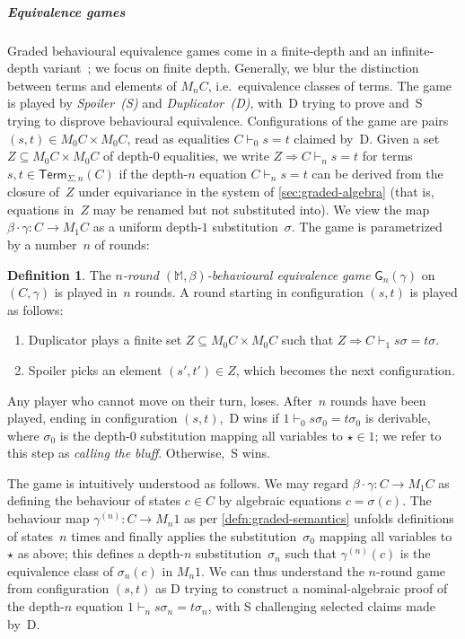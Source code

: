 \documentclass[11pt,a4paper]{amsart}
\newcommand{\Term}{\mathsf{Term}}
\newcommand{\centails}{\Rightarrow}
\newcommand{\game}{\mathsf{G}}
\newcommand{\pow}{\mathcal{P}}
\newcommand{\powf}{\pow_{\omega}}
\theoremstyle{plain}
\numberwithin{equation}{section}
\newcommand{\monad}{{\mathbb{M}}}
\newcommand{\+}[1]{\mathcal{#1}\xspace}
\theoremstyle{definition}
\newtheorem{defn}[defn]{Definition}
\begin{document}
\subparagraph*{Equivalence games} Graded behavioural equivalence games
come in a finite-depth and an infinite-depth
variant~\cite{FordEA22}; %
we focus on finite depth. Generally, we blur the distinction between
terms and elements of $M_nC$, i.e.~equivalence classes of terms.  The
game is played by \emph{Spoiler~(S)} and \emph{Duplicator~(D)}, with~D
trying to prove and~S trying to disprove behavioural
equivalence. Configurations of the game are pairs
$(s,t)\in M_0C\times M_0C$, read as equalities $C\vdash_0 s=t$ claimed
by~D. Given a set $Z\subseteq M_0C\times M_0C$ of depth-$0$
equalities, we write $Z\centails C\vdash_n s=t$ for terms
$s,t\in\Term_{\Sigma, n}(C)$ if the depth-$n$ equation $C\vdash_n s=t$
can be derived from the closure of~$Z$ under equivariance in the
system of \cref{sec:graded-algebra} (that is, equations in~$Z$ may be
renamed but not substituted into). We view the map
$\beta\cdot\gamma\colon C\to M_1C$ as a uniform depth-$1$
substitution~$\sigma$. The game is parametrized by a number~$n$ of
rounds: %

\begin{defn}
  The \emph{$n$-round $(\monad,\beta)$-behavioural equivalence game}
  $\game_n(\gamma)$ on~$(C,\gamma)$ is played in~$n$ rounds. A round
  starting in configuration $(s,t)$ is played as follows:
  \begin{enumerate}
  \item Duplicator plays a finite set $Z\subseteq M_0C\times M_0C$ such
    that $Z\centails C\vdash_1 s\sigma=t\sigma$.
  \item Spoiler picks an element $(s',t')\in Z$, which becomes the next
    configuration.
  \end{enumerate}
  Any player who cannot move on their turn, loses. After~$n$ rounds
  have been played, ending in configuration $(s,t)$,~D wins if
  $1\vdash_0 s\sigma_0=t\sigma_0$ is derivable, where $\sigma_0$ is the
  depth-$0$ substitution mapping all variables to $\star\in 1$; we
  refer to this step as \emph{calling the bluff}. Otherwise,~S wins.
\end{defn}
The game is intuitively understood as follows. We may regard
$\beta\cdot\gamma\colon C\to M_1C$ as defining the behaviour of states
$c\in C$ by algebraic equations $c=\sigma(c)$.  The behaviour map
$\gamma^{(n)}\colon C\to M_n1$ as per \cref{defn:graded-semantics}
unfolds definitions of states~$n$ times and finally applies the
substitution~$\sigma_0$ mapping all variables to $\star$ as above;
this defines a depth-$n$ substitution~$\sigma_n$ such that
$\gamma^{(n)}(c)$ is the equivalence class of $\sigma_n(c)$ in
$M_n1$. We can thus understand the $n$-round game from configuration
$(s,t)$ as D trying to construct a nominal-algebraic proof of the
depth-$n$ equation $1\vdash_n s\sigma_n=t\sigma_n$, with S challenging
selected claims made by~D.
\end{document}

